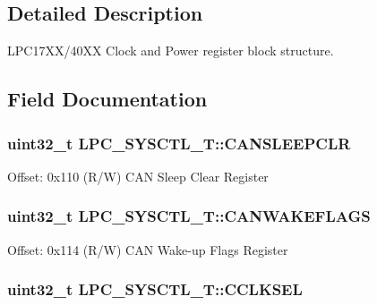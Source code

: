 \subsection{Detailed Description}
L\-P\-C17\-X\-X/40\-X\-X Clock and Power register block structure. 

\subsection{Field Documentation}
\hypertarget{structLPC__SYSCTL__T_aa6166dc2b9f99af318dfb44c259cff81}{
\subsubsection[{C\-A\-N\-S\-L\-E\-E\-P\-C\-L\-R}]{ uint32\-\_\-t L\-P\-C\-\_\-\-S\-Y\-S\-C\-T\-L\-\_\-\-T\-::\-C\-A\-N\-S\-L\-E\-E\-P\-C\-L\-R}}\label{structLPC__SYSCTL__T_aa6166dc2b9f99af318dfb44c259cff81}
Offset\-: 0x110 (R/\-W) C\-A\-N Sleep Clear Register \hypertarget{structLPC__SYSCTL__T_a4fee9b64e430f37988fe1fb566f6577e}{
\subsubsection[{C\-A\-N\-W\-A\-K\-E\-F\-L\-A\-G\-S}]{ uint32\-\_\-t L\-P\-C\-\_\-\-S\-Y\-S\-C\-T\-L\-\_\-\-T\-::\-C\-A\-N\-W\-A\-K\-E\-F\-L\-A\-G\-S}}\label{structLPC__SYSCTL__T_a4fee9b64e430f37988fe1fb566f6577e}
Offset\-: 0x114 (R/\-W) C\-A\-N Wake-\/up Flags Register \hypertarget{structLPC__SYSCTL__T_a5cebc138aa8f8591199efafea7bc316f}{
\subsubsection[{C\-C\-L\-K\-S\-E\-L}]{ uint32\-\_\-t L\-P\-C\-\_\-\-S\-Y\-S\-C\-T\-L\-\_\-\-T\-::\-C\-C\-L\-K\-S\-E\-L}}\label{structLPC__SYSCTL__T_a5cebc138aa8f8591199efafea7bc316f}
